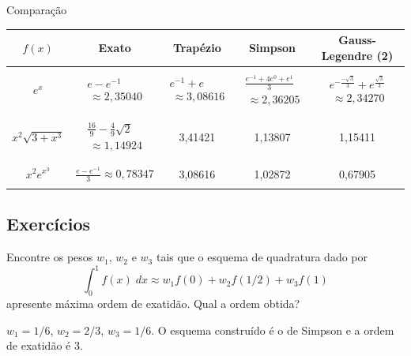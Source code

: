 \begin{ex} Comparação
  \begin{small}
\begin{tabular}{|c|c|c|c|c|}
\hline
$f(x)$&Exato&Trapézio&Simpson&Gauss-Legendre (2)\\
\hline
&&&&\\
$\displaystyle e^{x}$&$\displaystyle \begin{array}{l}e-e^{-1}\\~\approx 2,35040\end{array}$&$\displaystyle \begin{array}{l}e^{-1}+e \\ ~\approx 3,08616 \end{array}$&$\begin{array}{l}\displaystyle \frac{e^{-1}+4e^{0}+e^{1}}{3}\\ ~\approx  2,36205\end{array}$&$\begin{array}{l}\displaystyle e^{-\frac{-\sqrt{3}}{3}}+e^{\frac{\sqrt{3}}{3}}\\ ~\approx   2,34270\end{array}$\\
&&&&\\
 \hline
&&&&\\
$\displaystyle x^2\sqrt{3+x^3}$&$\begin{array}{l}\frac{16}{9}-\frac{4}{9}\sqrt{2}\\~\approx 1,14924\end{array}$&3,41421  & 1,13807 & 1,15411\\
&&&&\\
 \hline
&&&&\\
  $\displaystyle x^2e^{x^3}$&$\frac{e-e^{-1}}{3}\approx 0,78347$ & 3,08616     & 1,02872  & 0,67905\\
&&&&\\
 \hline
    \end{tabular}
  \end{small}
\end{ex}

\subsection*{Exercícios}

\begin{exer}
Encontre os pesos $w_1$, $w_2$ e $w_3$ tais que o esquema de quadratura dado por
\begin{equation} \int_{0}^{1}f(x)\;dx\approx w_1f(0)+w_2f(1/2)+w_3 f(1) \end{equation}
apresente máxima ordem de exatidão. Qual a ordem obtida?
\end{exer}
\begin{resp}

 $w_1=1/6$, $w_2=2/3$, $w_3=1/6$. O esquema construído é o de Simpson e a ordem de exatidão é 3.

\end{resp}


